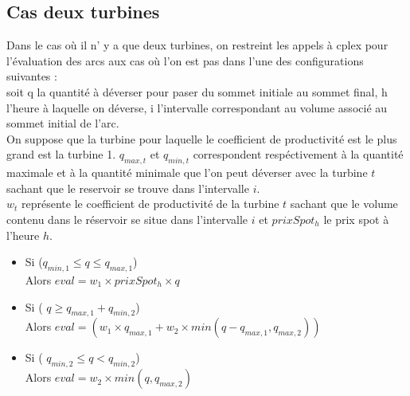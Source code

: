 \documentclass[a4paper]{report}
\begin{document}
\subsection{Cas deux turbines}
Dans le cas où il n' y a que deux turbines, on restreint les appels à cplex pour l'évaluation des arcs aux cas où l'on est pas dans l'une des configurations suivantes :\\
soit q la quantité à déverser pour paser du sommet initiale au sommet final, h l'heure à laquelle on déverse, i l'intervalle correspondant au volume associé au sommet initial de l'arc.\\
On suppose que la turbine pour laquelle le coefficient de productivité est le plus grand est la turbine 1. $q_{max,t}$ et $q_{min,t}$ correspondent respéctivement à la quantité maximale et à la quantité minimale que l'on peut déverser avec la turbine $t$ sachant que le reservoir se trouve dans l'intervalle $i$.\\
$w_t$ représente le coefficient de productivité de la turbine $t$ sachant que le volume contenu dans le réservoir se situe dans l'intervalle $i$ et $prixSpot_h$ le prix spot à l'heure $h$.\\
\begin{itemize}
  \item Si ($q_{min,1}\leq q \leq q_{max,1}$)\\
  \subitem Alors $eval = w_1 \times prixSpot_h \times q$\\
  \item Si ( $q\geq q_{max,1}+q_{min,2}$)\\
  \subitem Alors $eval=(w_1 \times q_{max,1} + w_2 \times min(q- q_{max,1},q_{max,2}))$\\
  \item Si ( $q_{min,2}\leq q  < q_{min,2}$)\\
  \subitem  Alors $eval= w_2 \times min(q,q_{max,2})$
\end{itemize}
\end{document}
